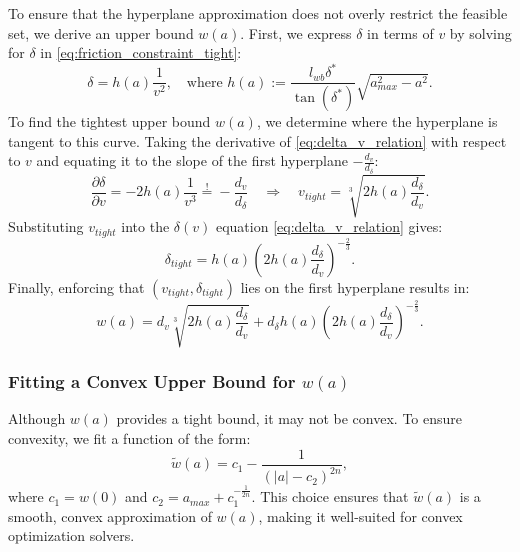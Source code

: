 To ensure that the hyperplane approximation does not overly restrict the feasible set, we derive an upper bound \( w(a) \).
First, we express \( \delta \) in terms of \( v \) by solving for \( \delta \) in \eqref{eq:friction_constraint_tight}:
\begin{equation}
	\label{eq:delta_v_relation}
	\delta = h(a) \frac{1}{v^2},
	\quad \text{where } h(a) := \frac{l_{wb} \delta^*}{\tan(\delta^*)} \sqrt{a_{max}^2 - a^2}.
\end{equation}
To find the tightest upper bound \( w(a) \), we determine where the hyperplane is tangent to this curve.
Taking the derivative of \eqref{eq:delta_v_relation} with respect to $v$ and equating it to the slope of the first hyperplane $-\frac{d_v}{d_\delta}$:
\begin{equation}
	\frac{\partial\delta}{\partial v} = -2 h(a) \frac{1}{v^3} \overset{!}{=} -\frac{d_v}{d_\delta} \quad \Rightarrow \quad v_{tight} = \sqrt[3]{2h(a)\frac{d_\delta}{d_v}}.
\end{equation}
Substituting $v_{tight}$ into the \( \delta(v) \) equation \eqref{eq:delta_v_relation} gives:
\begin{equation}
	\delta_{tight} = h(a) \left(2h(a)\frac{d_\delta}{d_v}\right)^{-\frac{2}{3}}.
\end{equation}
Finally, enforcing that \( (v_{tight}, \delta_{tight}) \) lies on the first hyperplane results in:
\begin{equation}
	w(a) = d_v \sqrt[3]{2h(a)\frac{d_\delta}{d_v}} + d_\delta h(a) \left(2h(a)\frac{d_\delta}{d_v}\right)^{-\frac{2}{3}}.
\end{equation}

\subsubsection{Fitting a Convex Upper Bound for \( w(a) \)}

Although \( w(a) \) provides a tight bound, it may not be convex.
To ensure convexity, we fit a function of the form:
\begin{equation}
	\tilde{w}(a) = c_1 - \frac{1}{(|a| - c_2)^{2n}},
	\label{eq:fitting_irrational}
\end{equation}
where \( c_1 = w(0) \) and \( c_2 = a_{max} + c_1^{-\frac{1}{2n}} \).
This choice ensures that \( \tilde{w}(a) \) is a smooth, convex approximation of \( w(a) \), making it well-suited for convex optimization solvers.



